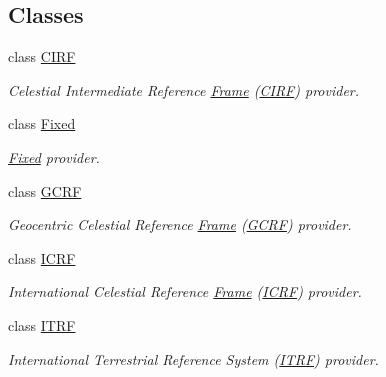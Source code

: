 \subsection*{Classes}
\begin{DoxyCompactItemize}
\item 
class \hyperlink{classlibrary_1_1physics_1_1coord_1_1frame_1_1provider_1_1_c_i_r_f}{C\+I\+RF}
\begin{DoxyCompactList}\small\item\em Celestial Intermediate Reference \hyperlink{classlibrary_1_1physics_1_1coord_1_1_frame}{Frame} (\hyperlink{classlibrary_1_1physics_1_1coord_1_1frame_1_1provider_1_1_c_i_r_f}{C\+I\+RF}) provider. \end{DoxyCompactList}\item 
class \hyperlink{classlibrary_1_1physics_1_1coord_1_1frame_1_1provider_1_1_fixed}{Fixed}
\begin{DoxyCompactList}\small\item\em \hyperlink{classlibrary_1_1physics_1_1coord_1_1frame_1_1provider_1_1_fixed}{Fixed} provider. \end{DoxyCompactList}\item 
class \hyperlink{classlibrary_1_1physics_1_1coord_1_1frame_1_1provider_1_1_g_c_r_f}{G\+C\+RF}
\begin{DoxyCompactList}\small\item\em Geocentric Celestial Reference \hyperlink{classlibrary_1_1physics_1_1coord_1_1_frame}{Frame} (\hyperlink{classlibrary_1_1physics_1_1coord_1_1frame_1_1provider_1_1_g_c_r_f}{G\+C\+RF}) provider. \end{DoxyCompactList}\item 
class \hyperlink{classlibrary_1_1physics_1_1coord_1_1frame_1_1provider_1_1_i_c_r_f}{I\+C\+RF}
\begin{DoxyCompactList}\small\item\em International Celestial Reference \hyperlink{classlibrary_1_1physics_1_1coord_1_1_frame}{Frame} (\hyperlink{classlibrary_1_1physics_1_1coord_1_1frame_1_1provider_1_1_i_c_r_f}{I\+C\+RF}) provider. \end{DoxyCompactList}\item 
class \hyperlink{classlibrary_1_1physics_1_1coord_1_1frame_1_1provider_1_1_i_t_r_f}{I\+T\+RF}
\begin{DoxyCompactList}\small\item\em International Terrestrial Reference System (\hyperlink{classlibrary_1_1physics_1_1coord_1_1frame_1_1provider_1_1_i_t_r_f}{I\+T\+RF}) provider. \end{DoxyCompactList}\item 

\end{DoxyCompactItemize}

